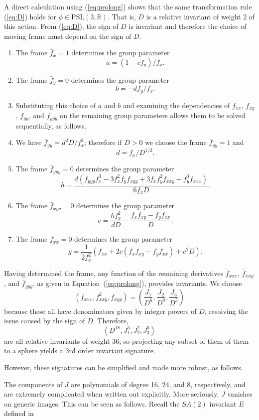 \documentclass[review,onefignum,onetabnum]{siamonline190516}
\def\R{\mathbb{R}}
\begin{document}
A direct calculation using (\ref{eq:prolong}) shows that the same transformation rule (\ref{eq:D}) holds for $\phi\in\mathrm{PSL}(3,\R)$.  That is, $D$ is a relative invariant of weight 2 of this action. From (\ref{eq:D}), the sign of $D$ is invariant and therefore the choice of moving frame must depend on the sign of $D$.

\begin{enumerate}
\item The frame $\bar f_x = 1$  determines the group parameter $$a = (1-c f_y)/f_x.$$
\item The frame $\bar f_y=  0$ determines the group parameter $$b = -d f_y/f_x.$$
\item Substituting this choice of $a$ and $b$ and examining the dependencies of $f_{xx}$, $f_{xy}$, $f_{yy}$, and $f_{yyy}$ on the remaining group parameters allows them to be solved sequentially, as follows.
\item We have $\bar f_{yy} = d^2 D/f_x^2$; therefore if $D>0$ we choose the frame
$\bar f_{yy} = 1$ and $$d = f_x/D^{1/2}.$$
\item The frame $\bar f_{yyy} = 0$ determines the group parameter
$$ h = \frac{d(f_{yyy}f_x^3 - 3 f_x^2 f_y f_{xyy} + 3 f_x f_y^2 f_{xxy} - f_y^3 f_{xxx})}{6 f_x D}.$$
\item The frame $\bar f_{xyy}=0$ determines the group parameter
$$ c = \frac{h f_x^2}{d D} - \frac{f_x f_{xy} - f_y f_{xx}}{D}.$$
\item The frame $\bar f_{xx}=0$ determines the group parameter
$$ g = \frac{1}{2 f_x^2}(f_{xx} + 2 c ( f_x f_{xy} - f_y f_{xx} ) + c^2 D).$$
\end{enumerate}

Having determined the frame, any function of the remaining derivatives $\bar f_{xxx}$, $\bar f_{xxy}$, and $\bar f_{yyy}$, as given in Equation~(\ref{eq:prolong}), provides invariants. We choose $$ (f_{xxx}, f_{xxy}^2, f_{xyy})=\left(\frac{J_1}{D^6},\frac{J_2}{D^9},\frac{J_3}{D^3}\right)$$
because these all have denominators given by integer powers  of $D$, resolving the issue caused
by the sign of $D$. Therefore,
$$ (D^{18}, J_1^3, J_2^2, J_3^6)$$
are all relative invariants of weight 36; so projecting any subset of them of them to a sphere
yields a 3rd order invariant signature.

However, these signatures can be simplified and made more robust, as follows.

The components of $J$ are polynomials of degree 16, 24, and 8, respectively, and are extremely complicated when written out explicitly. More seriously, $J$ vanishes on generic images. This can be seen as follows. 
Recall the $SA(2)$ invariant $E$ defined in 
\end{document}
